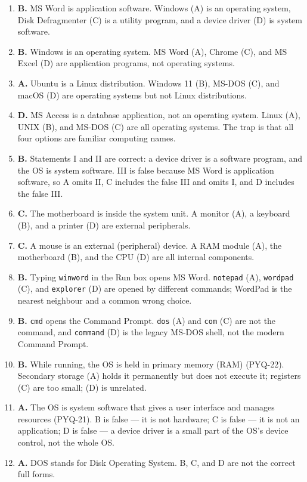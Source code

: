 \documentclass[11pt]{article}
\begin{document}
\begin{enumerate}[label=\textbf{Q\arabic*.}, leftmargin=*]
  describes a translator such as a compiler.
\item \textbf{B.} MS Word is application software. Windows (A) is an
  operating system, Disk Defragmenter (C) is a utility program, and a device
  driver (D) is system software.
\item \textbf{B.} Windows is an operating system. MS Word (A), Chrome (C),
  and MS Excel (D) are application programs, not operating systems.
\item \textbf{A.} Ubuntu is a Linux distribution. Windows 11 (B), MS-DOS
  (C), and macOS (D) are operating systems but not Linux distributions.
\item \textbf{D.} MS Access is a database application, not an operating
  system. Linux (A), UNIX (B), and MS-DOS (C) are all operating systems. The
  trap is that all four options are familiar computing names.
\item \textbf{B.} Statements I and II are correct: a device driver is a
  software program, and the OS is system software. III is false because MS
  Word is application software, so A omits II, C includes the false III and
  omits I, and D includes the false III.
\item \textbf{C.} The motherboard is inside the system unit. A monitor (A),
  a keyboard (B), and a printer (D) are external peripherals.
\item \textbf{C.} A mouse is an external (peripheral) device. A RAM module
  (A), the motherboard (B), and the CPU (D) are all internal components.
\item \textbf{B.} Typing \texttt{winword} in the Run box opens MS Word.
  \texttt{notepad} (A), \texttt{wordpad} (C), and \texttt{explorer} (D) are
  opened by different commands; WordPad is the nearest neighbour and a common
  wrong choice.
\item \textbf{B.} \texttt{cmd} opens the Command Prompt. \texttt{dos} (A) and
  \texttt{com} (C) are not the command, and \texttt{command} (D) is the
  legacy MS-DOS shell, not the modern Command Prompt.
\item \textbf{B.} While running, the OS is held in primary memory (RAM)
  (PYQ-22). Secondary storage (A) holds it permanently but does not execute
  it; registers (C) are too small; (D) is unrelated.
\item \textbf{A.} The OS is system software that gives a user interface and
  manages resources (PYQ-21). B is false --- it is not hardware; C is false
  --- it is not an application; D is false --- a device driver is a small
  part of the OS's device control, not the whole OS.
\item \textbf{A.} DOS stands for Disk Operating System. B, C, and D are not
  the correct full forms.


\end{enumerate}
\end{document}
